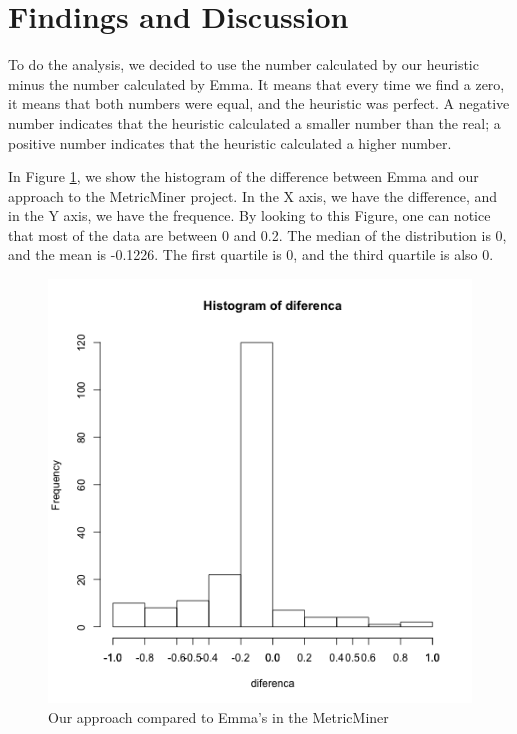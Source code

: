 \documentclass{sig-alternate}
\begin{document}
\section{Findings and Discussion}
\label{sec-results}

To do the analysis, we decided to use the number calculated by our heuristic minus the
number calculated by Emma. It means that every time we find a zero, it means that both numbers
were equal, and the heuristic was perfect. A negative number indicates that the heuristic calculated
a smaller number than the real; a positive number indicates that the heuristic calculated a higher
number.

In Figure \ref{fig:metricminer}, we show the histogram of the difference between Emma and our approach to
the MetricMiner project.
In the X axis, we have the difference, 
and in the Y axis, we have the frequence.
By looking to this Figure, one can notice that most of the data are between 0 and 0.2. 
The median of the distribution is 0, and the mean is -0.1226. The first quartile is 0, and the
third quartile is also 0.

\begin{figure}[h!H]
  \centering
  \includegraphics[scale=0.3]{../stats/metricminer-histograma-gelato.png}
  \caption{Our approach compared to Emma's in the MetricMiner}
  \label{fig:metricminer}
\end{figure}
\end{document}
